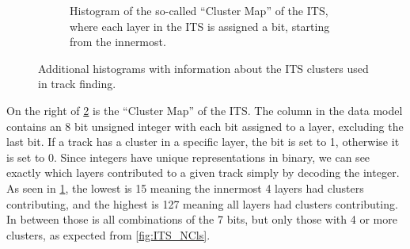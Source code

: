 \begin{figure}[h]
\begin{subfigure}[t]{.49\linewidth}
        \caption{Histogram of the so-called ``Cluster Map'' of the ITS, where each layer in the ITS is assigned a bit, starting from the innermost.}
        \label{fig:ITS_ClusterMap}
    \end{subfigure}
\caption[Histograms of cluster information for tracks in the ITS]{Additional histograms with information about the ITS clusters used in track finding.}
\label{fig:ITS_Clusters}
\end{figure}

On the right of \cref{fig:ITS_Clusters} is the ``Cluster Map'' of the ITS. The column in the data model contains an 8 bit unsigned integer with each bit assigned to a layer, excluding the last bit. If a track has a cluster in a specific layer, the bit is set to 1, otherwise it is set to 0. Since integers have unique representations in binary, we can see exactly which layers contributed to a given track simply by decoding the integer. As seen in \cref{fig:ITS_ClusterMap}, the lowest is 15 meaning the innermost 4 layers had clusters contributing, and the highest is 127 meaning all layers had clusters contributing. In between those is all combinations of the 7 bits, but only those with 4 or more clusters, as expected from \cref{fig:ITS_NCls}. 